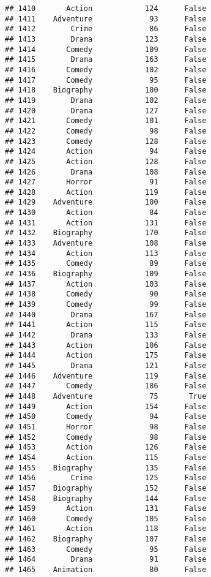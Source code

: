 \documentclass[
]{article}
\begin{document}
\begin{verbatim}
## 1410       Action            124      False
## 1411    Adventure             93      False
## 1412        Crime             86      False
## 1413        Drama            123      False
## 1414       Comedy            109      False
## 1415        Drama            163      False
## 1416       Comedy            102      False
## 1417       Comedy             95      False
## 1418    Biography            100      False
## 1419        Drama            102      False
## 1420        Drama            127      False
## 1421       Comedy            101      False
## 1422       Comedy             98      False
## 1423       Comedy            128      False
## 1424       Action             94      False
## 1425       Action            128      False
## 1426        Drama            108      False
## 1427       Horror             91      False
## 1428       Action            119      False
## 1429    Adventure            100      False
## 1430       Action             84      False
## 1431       Action            131      False
## 1432    Biography            170      False
## 1433    Adventure            108      False
## 1434       Action            113      False
## 1435       Comedy             89      False
## 1436    Biography            109      False
## 1437       Action            103      False
## 1438       Comedy             90      False
## 1439       Comedy             99      False
## 1440        Drama            167      False
## 1441       Action            115      False
## 1442        Drama            133      False
## 1443       Action            106      False
## 1444       Action            175      False
## 1445        Drama            121      False
## 1446    Adventure            119      False
## 1447       Comedy            186      False
## 1448    Adventure             75       True
## 1449       Action            154      False
## 1450       Comedy             94      False
## 1451       Horror             98      False
## 1452       Comedy             98      False
## 1453       Action            126      False
## 1454       Action            115      False
## 1455    Biography            135      False
## 1456        Crime            125      False
## 1457    Biography            152      False
## 1458    Biography            144      False
## 1459       Action            131      False
## 1460       Comedy            105      False
## 1461       Action            118      False
## 1462    Biography            107      False
## 1463       Comedy             95      False
## 1464        Drama             91      False
## 1465    Animation             80      False

\end{verbatim}
\end{document}
